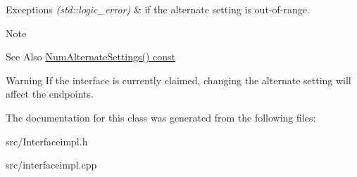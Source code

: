 \begin{DoxyExceptions}{Exceptions}
{\em (std\-::logic\-\_\-error)} & if the alternate setting is out-\/of-\/range. \\
\hline
\end{DoxyExceptions}
\begin{DoxyNote}{Note}

\end{DoxyNote}
\begin{DoxySeeAlso}{See Also}
\hyperlink{class_lib_u_s_b_1_1_interface_impl_a02737338ff031a77327fc54e4375e59a}{Num\-Alternate\-Settings() const} 
\end{DoxySeeAlso}
\begin{DoxyWarning}{Warning}
If the interface is currently claimed, changing the alternate setting will affect the endpoints. 
\end{DoxyWarning}


The documentation for this class was generated from the following files\-:\begin{DoxyCompactItemize}
\item 
src/Interfaceimpl.\-h\item 
src/interfaceimpl.\-cpp\end{DoxyCompactItemize}
